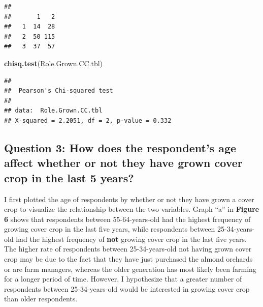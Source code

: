 \documentclass[12pt,]{article}
\newenvironment{Shaded}{\begin{snugshade}}{\end{snugshade}}
\newcommand{\KeywordTok}[1]{\textcolor[rgb]{0.13,0.29,0.53}{\textbf{#1}}}
\newcommand{\NormalTok}[1]{#1}
\begin{document}
\begin{verbatim}
##    
##       1   2
##   1  14  28
##   2  50 115
##   3  37  57
\end{verbatim}

\begin{Shaded}
\begin{Highlighting}[]
\KeywordTok{chisq.test}\NormalTok{(Role.Grown.CC.tbl)}
\end{Highlighting}
\end{Shaded}

\begin{verbatim}
## 
##  Pearson's Chi-squared test
## 
## data:  Role.Grown.CC.tbl
## X-squared = 2.2051, df = 2, p-value = 0.332
\end{verbatim}

\subsection{Question 3: How does the respondent's age affect whether or
not they have grown cover crop in the last 5
years?}\label{question-3-how-does-the-respondents-age-affect-whether-or-not-they-have-grown-cover-crop-in-the-last-5-years}

I first plotted the age of respondents by whether or not they have grown
a cover crop to visualize the relationship between the two variables.
Graph ``a'' in \textbf{Figure 6} shows that respondents between
55-64-years-old had the highest frequency of growing cover crop in the
last five years, while respondents between 25-34-years-old had the
highest frequency of \textbf{not} growing cover crop in the last five
years. The higher rate of respondents between 25-34-years-old not having
grown cover crop may be due to the fact that they have just purchased
the almond orchards or are farm managers, whereas the older generation
has most likely been farming for a longer period of time. However, I
hypothesize that a greater number of respondents between 25-34-years-old
would be interested in growing cover crop than older respondents.

  \providecommand{\huxb}[2]{\arrayrulecolor[RGB]{#1}\global\arrayrulewidth=#2pt}
  \providecommand{\huxvb}[2]{\color[RGB]{#1}\vrule width #2pt}
  \providecommand{\huxtpad}[1]{\rule{0pt}{\baselineskip+#1}}
  \providecommand{\huxbpad}[1]{\rule[-#1]{0pt}{#1}}
\end{document}
